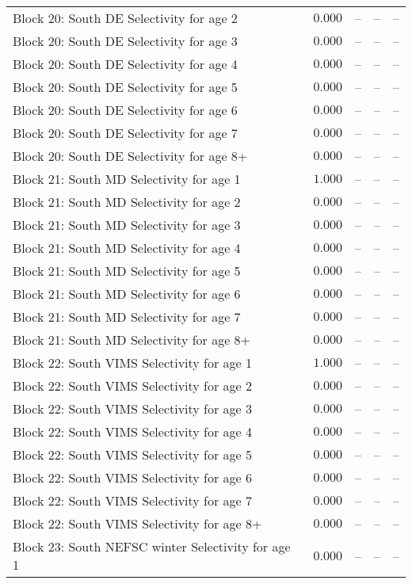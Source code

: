 \documentclass[
]{article}
\begin{document}
\begin{landscape}
\begin{longtable}[t]{lrrrr}
\addlinespace
Block 20: South DE Selectivity for age 2 & $0.000$ & -- & -- & --\\
Block 20: South DE Selectivity for age 3 & $0.000$ & -- & -- & --\\
Block 20: South DE Selectivity for age 4 & $0.000$ & -- & -- & --\\
Block 20: South DE Selectivity for age 5 & $0.000$ & -- & -- & --\\
Block 20: South DE Selectivity for age 6 & $0.000$ & -- & -- & --\\
\addlinespace
Block 20: South DE Selectivity for age 7 & $0.000$ & -- & -- & --\\
Block 20: South DE Selectivity for age 8+ & $0.000$ & -- & -- & --\\
Block 21: South MD Selectivity for age 1 & $1.000$ & -- & -- & --\\
Block 21: South MD Selectivity for age 2 & $0.000$ & -- & -- & --\\
Block 21: South MD Selectivity for age 3 & $0.000$ & -- & -- & --\\
\addlinespace
Block 21: South MD Selectivity for age 4 & $0.000$ & -- & -- & --\\
Block 21: South MD Selectivity for age 5 & $0.000$ & -- & -- & --\\
Block 21: South MD Selectivity for age 6 & $0.000$ & -- & -- & --\\
Block 21: South MD Selectivity for age 7 & $0.000$ & -- & -- & --\\
Block 21: South MD Selectivity for age 8+ & $0.000$ & -- & -- & --\\
\addlinespace
Block 22: South VIMS Selectivity for age 1 & $1.000$ & -- & -- & --\\
Block 22: South VIMS Selectivity for age 2 & $0.000$ & -- & -- & --\\
Block 22: South VIMS Selectivity for age 3 & $0.000$ & -- & -- & --\\
Block 22: South VIMS Selectivity for age 4 & $0.000$ & -- & -- & --\\
Block 22: South VIMS Selectivity for age 5 & $0.000$ & -- & -- & --\\
\addlinespace
Block 22: South VIMS Selectivity for age 6 & $0.000$ & -- & -- & --\\
Block 22: South VIMS Selectivity for age 7 & $0.000$ & -- & -- & --\\
Block 22: South VIMS Selectivity for age 8+ & $0.000$ & -- & -- & --\\
Block 23: South NEFSC winter Selectivity for age 1 & $0.000$ & -- & -- & --\\

\end{longtable}
\end{landscape}
\end{document}
